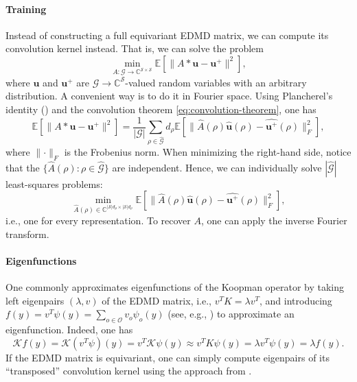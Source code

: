 \documentclass[preprint,12pt,authoryear]{elsarticle}
\newcommand{\C}{\mathbb{C}}
\newcommand{\Fourier}[1]{\widehat{#1}}
\newcommand\Kc{\mathcal K}
\newcommand\Gc{\mathcal G}
\newcommand\Oc{\mathcal O}
\newcommand\Sc{\mathcal S}
\newcommand\Koopman{\Kc}
\begin{document}
{\paragraph{Training}
Instead of constructing a full equivariant EDMD matrix, we can compute its convolution kernel instead. That is, we can solve the problem
$$
    \min_{A : \Gc \rightarrow \C^{\Sc \times \Sc}} \mathbb E [ \lVert A * \bm u - \bm u^+ \rVert^2 ],
$$
where $\bm u$ and $\bm u^+$ are $\Gc \rightarrow \C^\Sc$-valued random variables with an arbitrary distribution. A convenient way is to do it in Fourier space. Using Plancherel's identity () and the convolution theorem \eqref{eq:convolution-theorem}, one has
$$
    \mathbb E [ \lVert A * \bm u - \bm u^+ \rVert^2 ] =
    \frac 1 {|\Gc|} \sum_{\rho \in \Fourier{\Gc}} d_\rho \mathbb E [ \lVert \Fourier{ A }(\rho) \Fourier{\bm u}(\rho) - \Fourier{\bm u^+}(\rho) \rVert^2_F ],
$$
where $\lVert \cdot \rVert_F$ is the Frobenius norm.
When minimizing the right-hand side, notice that the $\{ \Fourier{A}(\rho) : \rho \in \Fourier{\Gc} \}$ are independent. Hence, we can individually solve $|\Fourier{\Gc}|$ least-squares problems:
\begin{equation}
     \min_{\Fourier{A}(\rho) \in \C^{|\Sc| d_\rho \times |\Sc|d_\rho}} \mathbb E[ \lVert \Fourier{A}(\rho) \Fourier{\bm u}(\rho) - \Fourier{\bm u^+}(\rho) \rVert^2_F ],
     \label{eq:convolution-separated-optimization-problem}
\end{equation}
i.e., one for every representation. To recover $A$, one can apply the inverse Fourier transform.

\paragraph{Eigenfunctions}
One commonly approximates eigenfunctions of the Koopman operator by taking left eigenpairs $(\lambda , v)$ of the EDMD matrix, i.e., $v^T K  = \lambda v^T$, and introducing $f(y) = v^T \psi(y) = \sum_{o \in \Oc} v_o \psi_o(y)$ (see, e.g., \cite{WKR15}) to approximate an eigenfunction. Indeed, one has 
$$
    \Koopman f(y) = \Koopman (v^T \psi )(y) = v^T \Koopman \psi(y) \approx v^T K \psi(y) = \lambda v^T \psi(y) = \lambda f(y).
$$
If the EDMD matrix is equivariant, one can simply  compute eigenpairs of its ``transposed'' convolution kernel using the approach from .



}
\end{document}
